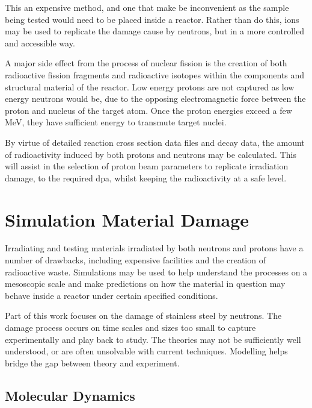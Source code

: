 This an expensive method, and one that make be inconvenient as the sample being tested would need to be placed inside a reactor.  Rather than do this, ions may be used to replicate the damage cause by neutrons, but in a more controlled and accessible way.

A major side effect from the process of nuclear fission is the creation of both radioactive fission fragments and radioactive isotopes within the components and structural material of the reactor.  Low energy protons are not captured as low energy neutrons would be, due to the opposing electromagnetic force between the proton and nucleus of the target atom.  Once the proton energies exceed a few MeV, they have sufficient energy to transmute target nuclei.

By virtue of detailed reaction cross section data files and decay data, the amount of radioactivity induced by both protons and neutrons may be calculated.  This will assist in the selection of proton beam parameters to replicate irradiation damage, to the required \acrshort{dpa}, whilst keeping the radioactivity at a safe level.




\FloatBarrier
\section{Simulation Material Damage}

Irradiating and testing materials irradiated by both neutrons and protons have a number of drawbacks, including expensive facilities and the creation of radioactive waste.  Simulations may be used to help understand the processes on a mesoscopic scale and make predictions on how the material in question may behave inside a reactor under certain specified conditions.

Part of this work focuses on the damage of stainless steel by neutrons.  The damage process occurs on time scales and sizes too small to capture experimentally and play back to study.  The theories may not be sufficiently well understood, or are often unsolvable with current techniques.  Modelling helps bridge the gap between theory and experiment. 

\subsection{Molecular Dynamics}
 

